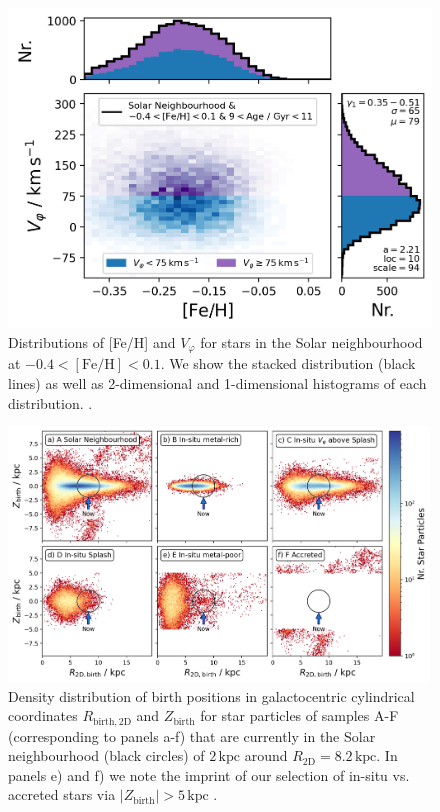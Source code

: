 \documentclass[fleqn,usenatbib]{mnras}
\begin{document}
\begin{figure}
    \centering
    \includegraphics[width=\columnwidth]{figures/splash_vphi_distribution.png}
    \caption{Distributions of [Fe/H] and $V_\varphi$ for stars in the Solar neighbourhood at $-0.4 < \mathrm{[Fe/H]} < 0.1$. We show the stacked distribution (black lines) as well as 2-dimensional and 1-dimensional histograms of each distribution.
    \href{https://github.com/svenbuder/golden_thread_II/tree/main/figures}{\faGithub}.}
    \label{fig:splash_vphi_distribution}
\end{figure}

\begin{figure}
    \centering
    \includegraphics[width=0.995\textwidth]{figures/splash_rbirth_zbirth}
    \caption{Density distribution of birth positions in galactocentric cylindrical coordinates $R_\mathrm{birth, 2D}$ and $Z_\mathrm{birth}$ for star particles of samples A-F (corresponding to panels a-f) that are currently in the Solar neighbourhood (black circles) of $2\,\mathrm{kpc}$ around $R_\mathrm{2D} = 8.2\,\mathrm{kpc}$. In panels e) and f) we note the imprint of our selection of in-situ vs. accreted stars via $\vert Z_\mathrm{birth} \vert > 5\,\mathrm{kpc}$  \href{https://github.com/svenbuder/golden_thread_II/tree/main/figures}{\faGithub}.}
    \label{fig:splash_rbirth_zbirth}
\end{figure}
\end{document}
